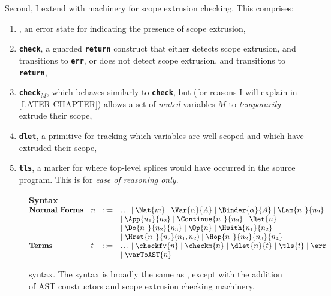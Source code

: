 Second, I extend \efflang{} with machinery for scope extrusion checking. This comprises:
\begin{enumerate}
\item \err{}, an error state for indicating the presence of scope extrusion,
\item \textbf{\texttt{check}}, a guarded \textbf{\texttt{return}} construct that either detects scope extrusion, and transitions to \textbf{\texttt{err}}, or does not detect scope extrusion, and transitions to \textbf{\texttt{return}},
\item \textbf{\texttt{check$_M$}}, which behaves similarly to \textbf{\texttt{check}}, but (for reasons I will explain in [LATER CHAPTER]) allows a set of \textit{muted} variables $M$ to \textit{temporarily} extrude their scope,
\item \textbf{\texttt{dlet}}, a primitive for tracking which variables are well-scoped and which have extruded their scope,
\item \textbf{\texttt{tls}}, a marker for where top-level splices would have occurred in the source program. This is for \textit{ease of reasoning only}. 
\end{enumerate}

\begin{figure}
\begin{core-desc}
  {\large \textbf{Syntax}} \\

  $\begin{array}{@{}llll}
    \textbf{Normal Forms} & n & ::= & \ldots \mid \Nat{m} \mid \Var{\alpha}{A} \mid \Binder{\alpha}{A} \mid \Lam{n_1}{n_2}  \\ 
  &&&\mid \App{n_1}{n_2} \mid \Continue{n_1}{n_2} \mid \Ret{n}   \\ 
  &&& \mid \Do{n_1}{n_2}{n_3} \mid \Op{n} \mid \Hwith{n_1}{n_2}   \\
  &&&\mid \Hret{n_1}{n_2}(n_1, n_2) \mid \Hop{n_1}{n_2}{n_3}{n_4} \\
  \textbf{Terms} & t & ::= & \ldots \mid \checkfv{n} \mid \checkm{n} \mid \dlet{n}{t} \mid \tls{t} \mid \err \\ &&& \mid \varToAST{n}
  \end{array}$
\end{core-desc}
\caption{\coreLang{} syntax. The syntax is broadly the same as \efflang{}, except with the addition of AST constructors and scope extrusion checking machinery.}
\label{fig:source-syntax}
\end{figure}

